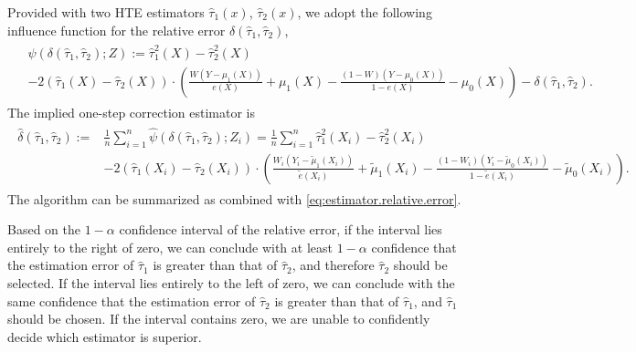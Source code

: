 \documentclass{article}
\theoremstyle{plain}
\theoremstyle{definition}
\theoremstyle{plain}
\begin{document}
Provided with two HTE estimators $\hat{\tau}_1(x)$, $\hat{\tau}_2(x)$, we adopt the following influence function for the relative error $\delta(\hat{\tau}_1, \hat{\tau}_2)$,
\begin{align}\label{eq:EIF.relative} 
\begin{split}    
    &\psi(\delta(\hat{\tau}_1, \hat{\tau}_2); Z)
    := \hat{\tau}_1^2(X) - \hat{\tau}_2^2(X) \\
    &- 2\left(\hat{\tau}_1(X) - \hat{\tau}_2(X)\right) \cdot \left(\frac{W(Y - \mu_1(X))}{e(X)} + \mu_1(X)- \frac{(1-W)(Y - \mu_0(X))}{1-e(X)} - \mu_0(X)\right) - \delta(\hat{\tau}_1, \hat{\tau}_2).
\end{split}
\end{align}
The implied one-step correction estimator is
\begin{align}\label{eq:estimator.relative.error}
\begin{split}    
    \hat{\delta}(\hat{\tau}_1, \hat{\tau}_2)
    :=&\frac{1}{n} \sum_{i=1}^n  \hat{\psi}(\delta(\hat{\tau}_1, \hat{\tau}_2); Z_i)
    = \frac{1}{n} \sum_{i=1}^n \hat{\tau}_1^2(X_i) - \hat{\tau}_2^2(X_i) \\
    &- 2\left(\hat{\tau}_1(X_i) - \hat{\tau}_2(X_i)\right) \cdot \left(\frac{W_i(Y_i - \tilde{\mu}_1(X_i))}{\tilde{e}(X_i)} + \tilde{\mu}_1(X_i)- \frac{(1-W_i)(Y_i - \tilde{\mu}_0(X_i))}{1-\tilde{e}(X_i)} - \tilde{\mu}_0(X_i)\right).
\end{split}
\end{align}
The algorithm can be summarized as  combined with \eqref{eq:estimator.relative.error}.


Based on the $1-\alpha$ confidence interval of the relative error, if the interval lies entirely to the right of zero, we can conclude with at least $1-\alpha$ confidence that the estimation error of $\hat{\tau}_1$ is greater than that of $\hat{\tau}_2$, and therefore $\hat{\tau}_2$ should be selected. 
If the interval lies entirely to the left of zero, we can conclude with the same confidence that the estimation error of $\hat{\tau}_2$ is greater than that of $\hat{\tau}_1$, and $\hat{\tau}_1$ should be chosen. 
If the interval contains zero, we are unable to confidently decide which estimator is superior.
\end{document}
